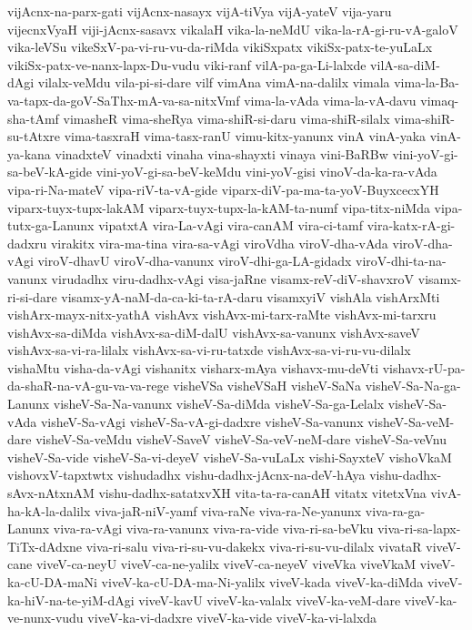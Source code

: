 {vijAcnx-na-parx-gati
vijAcnx-nasayx
vijA-tiVya
vijA-yateV
vija-yaru
vijecnxVyaH
viji-jAcnx-sasavx
vikalaH
vika-la-neMdU
vika-la-rA-gi-ru-vA-galoV
vika-leVSu
vikeSxV-pa-vi-ru-vu-da-riMda
vikiSxpatx
vikiSx-patx-te-yuLaLx
vikiSx-patx-ve-nanx-lapx-Du-vudu
viki-ranf
vilA-pa-ga-Li-lalxde
vilA-sa-diM-dAgi
vilalx-veMdu
vila-pi-si-dare
vilf
vimAna
vimA-na-dalilx
vimala
vima-la-Ba-va-tapx-da-goV-SaThx-mA-va-sa-nitxVmf
vima-la-vAda
vima-la-vA-davu
vimaq-sha-tAmf
vimasheR
vima-sheRya
vima-shiR-si-daru
vima-shiR-silalx
vima-shiR-su-tAtxre
vima-tasxraH
vima-tasx-ranU
vimu-kitx-yanunx
vinA
vinA-yaka
vinA-ya-kana
vinadxteV
vinadxti
vinaha
vina-shayxti
vinaya
vini-BaRBw
vini-yoV-gi-sa-beV-kA-gide
vini-yoV-gi-sa-beV-keMdu
vini-yoV-gisi
vinoV-da-ka-ra-vAda
vipa-ri-Na-mateV
vipa-riV-ta-vA-gide
viparx-diV-pa-ma-ta-yoV-BuyxcecxYH
viparx-tuyx-tupx-lakAM
viparx-tuyx-tupx-la-kAM-ta-numf
vipa-titx-niMda
vipa-tutx-ga-Lanunx
vipatxtA
vira-La-vAgi
vira-canAM
vira-ci-tamf
vira-katx-rA-gi-dadxru
virakitx
vira-ma-tina
vira-sa-vAgi
viroVdha
viroV-dha-vAda
viroV-dha-vAgi
viroV-dhavU
viroV-dha-vanunx
viroV-dhi-ga-LA-gidadx
viroV-dhi-ta-na-vanunx
virudadhx
viru-dadhx-vAgi
visa-jaRne
visamx-reV-diV-shavxroV
visamx-ri-si-dare
visamx-yA-naM-da-ca-ki-ta-rA-daru
visamxyiV
vishAla
vishArxMti
vishArx-mayx-nitx-yathA
vishAvx
vishAvx-mi-tarx-raMte
vishAvx-mi-tarxru
vishAvx-sa-diMda
vishAvx-sa-diM-dalU
vishAvx-sa-vanunx
vishAvx-saveV
vishAvx-sa-vi-ra-lilalx
vishAvx-sa-vi-ru-tatxde
vishAvx-sa-vi-ru-vu-dilalx
vishaMtu
visha-da-vAgi
vishanitx
visharx-mAya
vishavx-mu-deVti
vishavx-rU-pa-da-shaR-na-vA-gu-va-va-rege
visheVSa
visheVSaH
visheV-SaNa
visheV-Sa-Na-ga-Lanunx
visheV-Sa-Na-vanunx
visheV-Sa-diMda
visheV-Sa-ga-Lelalx
visheV-Sa-vAda
visheV-Sa-vAgi
visheV-Sa-vA-gi-dadxre
visheV-Sa-vanunx
visheV-Sa-veM-dare
visheV-Sa-veMdu
visheV-SaveV
visheV-Sa-veV-neM-dare
visheV-Sa-veVnu
visheV-Sa-vide
visheV-Sa-vi-deyeV
visheV-Sa-vuLaLx
vishi-SayxteV
vishoVkaM
vishovxV-tapxtwtx
vishudadhx
vishu-dadhx-jAcnx-na-deV-hAya
vishu-dadhx-sAvx-nAtxnAM
vishu-dadhx-satatxvXH
vita-ta-ra-canAH
vitatx
vitetxVna
vivA-ha-kA-la-dalilx
viva-jaR-niV-yamf
viva-raNe
viva-ra-Ne-yanunx
viva-ra-ga-Lanunx
viva-ra-vAgi
viva-ra-vanunx
viva-ra-vide
viva-ri-sa-beVku
viva-ri-sa-lapx-TiTx-dAdxne
viva-ri-salu
viva-ri-su-vu-dakekx
viva-ri-su-vu-dilalx
vivataR
viveV-cane
viveV-ca-neyU
viveV-ca-ne-yalilx
viveV-ca-neyeV
viveVka
viveVkaM
viveV-ka-cU-DA-maNi
viveV-ka-cU-DA-ma-Ni-yalilx
viveV-kada
viveV-ka-diMda
viveV-ka-hiV-na-te-yiM-dAgi
viveV-kavU
viveV-ka-valalx
viveV-ka-veM-dare
viveV-ka-ve-nunx-vudu
viveV-ka-vi-dadxre
viveV-ka-vide
viveV-ka-vi-lalxda
}
